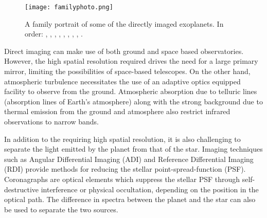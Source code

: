 \begin{figure}[t]
	\centering
	\texttt{[image: familyphoto.png]}
	\caption{A family portrait of some of the directly imaged exoplanets.
		In order:
	\parencite{Marois2010}, \parencite{Rameau2013}, \parencite{Stolker2020}, \parencite{Sallum2015}, \parencite{Keppler2018}, \parencite{Currie2012}, \parencite{Macintosh2015}, \parencite{Chauvin2004}, \parencite{Quanz2010}.}
	\label{fig:family}
\end{figure}

Direct imaging can make use of both ground and space based observatories. 
However, the high spatial resolution required drives the need for a large primary mirror, limiting the possibilities of space-based telescopes. 
On the other hand, atmospheric turbulence necessitates the use of an adaptive optics equipped facility to observe from the ground. 
Atmospheric absorption due to telluric lines (absorption lines of Earth's atmosphere) along with the strong background due to thermal emission from the ground and atmosphere also restrict infrared observations to narrow bands.

In addition to the requiring high spatial resolution, it is also challenging to separate the light emitted by the planet from that of the star.
Imaging techniques such as Angular Differential Imaging (ADI) \parencite{Marois2006} and Reference Differential Imaging (RDI) \parencite{Lafreniere2009,Soummer2011} provide methods for reducing the stellar point-spread-function (PSF). %
Coronagraphs are optical elements which suppress the stellar PSF through self-destructive interference or physical occultation, depending on the position in the optical path.
The difference in spectra between the planet and the star can also be used to separate the two sources.

